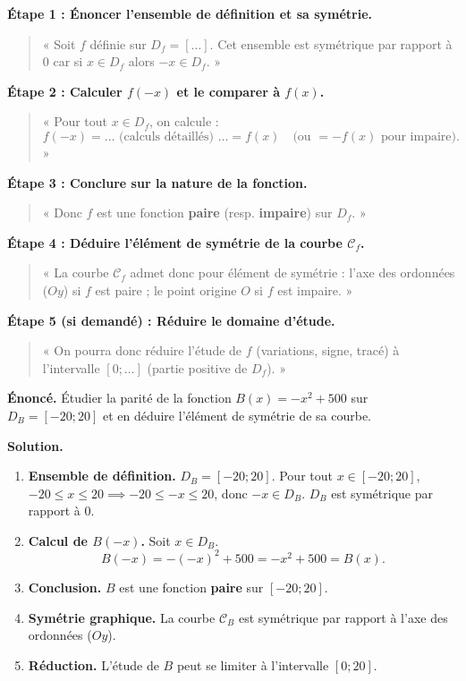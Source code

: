 \documentclass[11pt]{article}
\begin{document}
\begin{methode}
\textbf{Étape 1 : Énoncer l'ensemble de définition et sa symétrie.}
\begin{quote}
« Soit $f$ définie sur $D_f = [\dots]$. Cet ensemble est symétrique par rapport à $0$ car si $x \in D_f$ alors $-x \in D_f$. »
\end{quote}

\textbf{Étape 2 : Calculer $f(-x)$ et le comparer à $f(x)$.}
\begin{quote}
« Pour tout $x \in D_f$, on calcule :
\[
f(-x) = \dots \text{ (calculs détaillés) } \dots = f(x) \quad \text{(ou } = -f(x) \text{ pour impaire).}
\] »
\end{quote}

\textbf{Étape 3 : Conclure sur la nature de la fonction.}
\begin{quote}
« Donc $f$ est une fonction \textbf{paire} (resp. \textbf{impaire}) sur $D_f$. »
\end{quote}

\textbf{Étape 4 : Déduire l'élément de symétrie de la courbe $\mathcal{C}_f$.}
\begin{quote}
« La courbe $\mathcal{C}_f$ admet donc pour élément de symétrie : l'axe des ordonnées ($Oy$) si $f$ est paire ; le point origine $O$ si $f$ est impaire. »
\end{quote}

\textbf{Étape 5 (si demandé) : Réduire le domaine d'étude.}
\begin{quote}
« On pourra donc réduire l'étude de $f$ (variations, signe, tracé) à l'intervalle $[0 ; \dots]$ (partie positive de $D_f$). »
\end{quote}
\end{methode}

\begin{exoresolu}[Application du modèle à $B(x) = -x^2 + 500$]
\textbf{Énoncé.} Étudier la parité de la fonction $B(x) = -x^2 + 500$ sur $D_B = [-20 ; 20]$ et en déduire l'élément de symétrie de sa courbe.

\textbf{Solution.}
\begin{enumerate}
    \item \textbf{Ensemble de définition.} $D_B = [-20 ; 20]$. Pour tout $x \in [-20 ; 20]$, $-20 \le x \le 20 \implies -20 \le -x \le 20$, donc $-x \in D_B$. $D_B$ est symétrique par rapport à $0$.
    \item \textbf{Calcul de $B(-x)$.} Soit $x \in D_B$.
    \[
    B(-x) = -(-x)^2 + 500 = -x^2 + 500 = B(x).
    \]
    \item \textbf{Conclusion.} $B$ est une fonction \textbf{paire} sur $[-20 ; 20]$.
    \item \textbf{Symétrie graphique.} La courbe $\mathcal{C}_B$ est symétrique par rapport à l'axe des ordonnées ($Oy$).
    \item \textbf{Réduction.} L'étude de $B$ peut se limiter à l'intervalle $[0 ; 20]$.
\end{enumerate}
\end{exoresolu}
\end{document}
